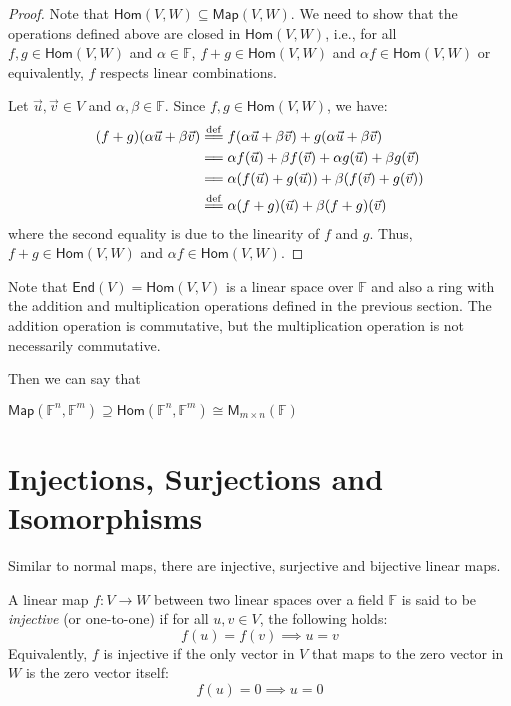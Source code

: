 \documentclass[
	11pt, %
	fleqn, %
	a4paper, %
]{LegrandOrangeBook}
\newcommand{\End}[1]{\mathsf{End}(#1)} %
\newcommand{\Hom}{\mathsf{Hom}} %
\newcommand{\F}{\mathbb{F}} %
\newcommand{\M}[2]{\mathsf{M}_{#1}(#2)} %
\newcommand{\Map}{\mathsf{Map}} %
\begin{document}
\begin{proof}
    Note that $\Hom(V, W) \subseteq \Map(V, W)$. We need to show that the operations defined above are closed in $\Hom(V, W)$, i.e., for all $f, g \in \Hom(V, W)$ and $\alpha \in \F$, $f + g \in \Hom(V, W)$ and $\alpha f \in \Hom(V, W)$ or equivalently, $f$ respects linear combinations.

    Let $\vec{u}, \vec{v} \in V$ and $\alpha, \beta \in \F$. Since $f, g \in \Hom(V, W)$, we have:
    \[
        \begin{split}
            (f + g)(\alpha\vec{u} + \beta\vec{v}) &\overset{\mathrm{def}}{=\joinrel=} f(\alpha\vec{u} + \beta\vec{v}) + g(\alpha\vec{u} + \beta\vec{v}) \\
            &=\joinrel= \alpha f(\vec{u}) + \beta f(\vec{v}) + \alpha g(\vec{u}) + \beta g(\vec{v}) \\
            &=\joinrel= \alpha (f(\vec{u}) + g(\vec{u})) + \beta (f(\vec{v}) + g(\vec{v})) \\
            &\overset{\mathrm{def}}{=\joinrel=} \alpha (f + g)(\vec{u}) + \beta (f + g)(\vec{v})
        \end{split}
    \]
    where the second equality is due to the linearity of $f$ and $g$. Thus, $f + g \in \Hom(V, W)$ and $\alpha f \in \Hom(V, W)$.
\end{proof}
\begin{remark}
    Note that $\End{V} = \Hom(V, V)$ is a linear space over $\F$ and also a ring with the addition and multiplication operations defined in the previous section. The addition operation is commutative, but the multiplication operation is not necessarily commutative.
\end{remark}

Then we can say that 
\begin{center}
    $\Map(\F^n, \F^m) \supseteq \Hom(\F^n, \F^m) \cong \M{m \times n}{\F}$
\end{center}


\newpage

\section{Injections, Surjections and Isomorphisms}

Similar to normal maps, there are injective, surjective and bijective linear maps.

\begin{definition}
    A linear map $f: V \to W$ between two linear spaces over a field $\F$ is said to be \emph{injective} (or one-to-one) if for all $u, v \in V$, the following holds:
    \[
        f(u) = f(v) \implies u = v
    \]
    Equivalently, $f$ is injective if the only vector in $V$ that maps to the zero vector in $W$ is the zero vector itself:
    \[
        f(u) = 0 \implies u = 0
    \]
\end{definition}
\end{document}
